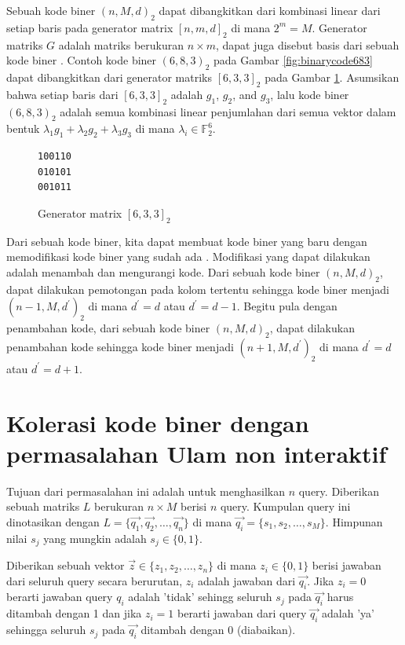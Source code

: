 Sebuah kode biner $(n,M,d)_2$ dapat dibangkitkan dari kombinasi linear dari setiap baris pada generator matrix $[n,m,d]_2$ di mana $2^m = M$. Generator matriks $G$ adalah matriks berukuran $n \times m$, dapat juga disebut basis dari sebuah kode biner \cite{VanLint2016}. Contoh kode biner $(6,8,3)_2$ pada Gambar \ref{fig:binarycode683} dapat dibangkitkan dari generator matriks $[6,3,3]_2$ pada Gambar \ref{fig:generator633}. Asumsikan bahwa setiap baris dari $[6,3,3]_2$ adalah $g_1$, $g_2$, and $g_3$, lalu kode biner $(6,8,3)_2$ adalah semua kombinasi linear penjumlahan dari semua vektor dalam bentuk ${\lambda}_1 g_1 + {\lambda}_2 g_2 + {\lambda}_3 g_3$ di mana $\lambda_{i} \in \mathbb{F}_2^6$.

\begin{figure}
\centering
\begin{BVerbatim}
100110
010101
001011
\end{BVerbatim}
\caption{Generator matrix $[6,3,3]_2$}
\label{fig:generator633}
\end{figure}

Dari sebuah kode biner, kita dapat membuat kode biner yang baru dengan memodifikasi kode biner yang sudah ada \cite{Huffman}. Modifikasi yang dapat dilakukan adalah menambah dan mengurangi kode. Dari sebuah kode biner $(n,M,d)_2$, dapat dilakukan pemotongan pada kolom tertentu sehingga kode biner menjadi $(n-1,M,d^\prime)_2$ di mana $d^\prime=d$ atau $d^\prime=d-1$. Begitu pula dengan penambahan kode, dari sebuah kode biner $(n,M,d)_2$, dapat dilakukan penambahan kode sehingga kode biner menjadi $(n+1,M,d^\prime)_2$ di mana $d^\prime=d$ atau $d^\prime=d+1$.

\section{Kolerasi kode biner dengan permasalahan Ulam non interaktif}

Tujuan dari permasalahan ini adalah untuk menghasilkan $n$ query. Diberikan sebuah matriks $L$ berukuran $n \times M$ berisi $n$ query. Kumpulan query ini dinotasikan dengan $L = \{\vec{q_1},\vec{q_2},\ldots,\vec{q_n}\}$ di mana $\vec{q_i} = \{s_1,s_2,\ldots,s_M\}$. Himpunan nilai $s_j$ yang mungkin adalah $s_j \in \{0,1\}$.

Diberikan sebuah vektor $\vec{z} \in \{z_1,z_2,\ldots,z_n\}$ di mana $z_i \in \{0,1\}$ berisi jawaban dari seluruh query secara berurutan, $z_i$ adalah jawaban dari $\vec{q_i}$. Jika $z_i=0$ berarti jawaban query $q_i$ adalah 'tidak' sehingg seluruh $s_j$ pada $\vec{q_i}$ harus ditambah dengan 1 dan jika $z_i=1$ berarti jawaban dari query $\vec{q_i}$ adalah 'ya' sehingga seluruh $s_j$ pada $\vec{q_i}$ ditambah dengan 0 (diabaikan).

